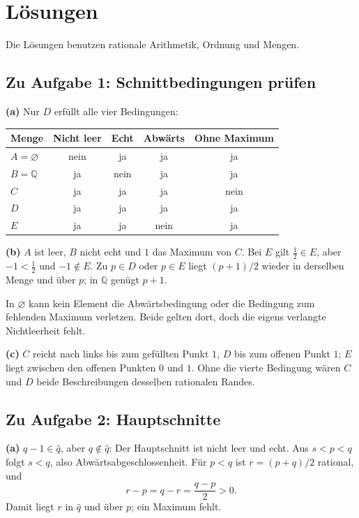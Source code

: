 \clearpage
\section{Lösungen}
\label{cuts:solutions}
Die Lösungen benutzen rationale Arithmetik, Ordnung und Mengen.

\subsection*{Zu Aufgabe 1: Schnittbedingungen prüfen}
\textbf{(a)} Nur $D$ erfüllt alle vier Bedingungen:
\begin{center}
\renewcommand{\arraystretch}{1.1}
\begin{tabular}{@{}lcccc@{}}
\toprule
Menge & Nicht leer & Echt & Abwärts & Ohne Maximum\\
\midrule
$A=\varnothing$ & nein & ja & ja & ja\\
$B=\mathbb Q$ & ja & nein & ja & ja\\
$C$ & ja & ja & ja & nein\\
$D$ & ja & ja & ja & ja\\
$E$ & ja & ja & nein & ja\\
\bottomrule
\end{tabular}
\end{center}
\textbf{(b)} $A$ ist leer, $B$ nicht echt und $1$ das Maximum von $C$.
Bei $E$ gilt $\frac12\in E$, aber $-1<\frac12$ und $-1\notin E$.
Zu $p\in D$ oder $p\in E$ liegt $(p+1)/2$ wieder in derselben
Menge und über $p$; in $\mathbb Q$ genügt $p+1$.

In $\varnothing$ kann kein Element die Abwärtsbedingung oder
die Bedingung zum fehlenden Maximum verletzen. Beide gelten
dort, doch die eigens verlangte Nichtleerheit fehlt.

\textbf{(c)} $C$ reicht nach links bis zum gefüllten Punkt $1$,
$D$ bis zum offenen Punkt $1$; $E$ liegt zwischen den offenen
Punkten $0$ und $1$. Ohne die vierte Bedingung wären $C$ und $D$
beide Beschreibungen desselben rationalen Randes.

\subsection*{Zu Aufgabe 2: Hauptschnitte}
\textbf{(a)} $q-1\in\widehat q$, aber $q\notin\widehat q$:
Der Hauptschnitt ist nicht leer und echt.
Aus $s<p<q$ folgt $s<q$, also Abwärtsabgeschlossenheit.
Für $p<q$ ist $r=(p+q)/2$ rational, und
\[
 r-p=q-r=\frac{q-p}{2}>0.
\]
Damit liegt $r$ in $\widehat q$ und über $p$; ein Maximum fehlt.

